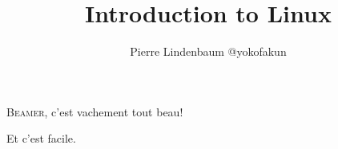 \documentclass{beamer}
\title{Introduction to Linux}
\author{Pierre Lindenbaum @yokofakun}\institute{Institut du Thorax. Nantes. France}
\begin{document}
  \begin{frame}
  \titlepage
  \end{frame}

  \begin{frame}
  \textsc{Beamer}, c'est vachement tout beau!
  \end{frame}

  \begin{frame}
  Et c'est facile.
  \end{frame}

  
\end{document}
